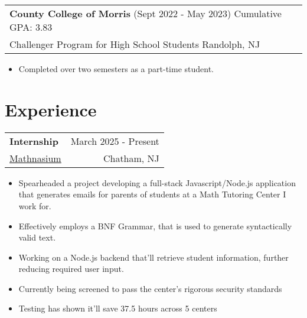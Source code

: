 \documentclass{article}
\begin{document}
    \vspace{-5pt}\begin{center}
        \begin{tabular}{p{}}
            {\large \bf County College of Morris} (Sept 2022 - May 2023) \hfill Cumulative GPA: 3.83 \\
            Challenger Program for High School Students \hfill Randolph, NJ
        \end{tabular}
    \end{center}
    \vspace{-10pt}\begin{itemize}
        \item Completed over two semesters as a part-time student.
    \end{itemize}

\section{Experience} \vspace{4pt}
    \raggedright\begin{tabular}{lr}
        \parbox[l]{3.65in}{\bf{\large{Internship}}} &
        \parbox[r]{3.65in}{\raggedleft March 2025 - Present} \\
        \parbox[l]{3.65in}{\href{https://www.mathnasium.com/math-centers/chatham}{\underline{Mathnasium}}} &
        \parbox[r]{3.65in}{\raggedleft Chatham, NJ}
    \end{tabular}
    \vspace{-10pt}\begin{itemize} 
        \setlength{\itemsep}{-2pt}
        \item Spearheaded a project developing a full-stack Javascript/Node.js application that generates emails for parents of students at a Math Tutoring Center I work for.
        \item Effectively employs a BNF Grammar, that is used to generate syntactically valid text.
        \item Working on a Node.js backend that'll retrieve student information, further reducing required user input.
        \item Currently being screened to pass the center's rigorous security standards
        \item Testing has shown it'll save 37.5 hours across 5 centers
    \end{itemize}
\end{document}
